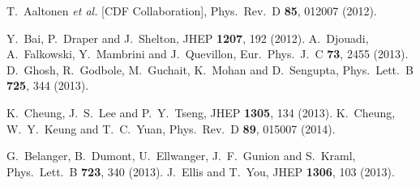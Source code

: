 \documentclass[aps,prl,twocolumn,preprintnumbers,groupedaddress,nofootinbib]{revtex4}
\begin{document}
\begin{thebibliography}{99}
  T.~Aaltonen {\it et al.}  [CDF Collaboration],
  Phys.\ Rev.\ D {\bf 85}, 012007 (2012).

  Y.~Bai, P.~Draper and J.~Shelton,
  JHEP {\bf 1207}, 192 (2012).
  A.~Djouadi, A.~Falkowski, Y.~Mambrini and J.~Quevillon,
  Eur.\ Phys.\ J.\ C {\bf 73}, 2455 (2013).
  D.~Ghosh, R.~Godbole, M.~Guchait, K.~Mohan and D.~Sengupta,
  Phys.\  Lett.\ B {\bf 725}, 344 (2013).
  
  K.~Cheung, J.~S.~Lee and P.~Y.~Tseng,
  JHEP {\bf 1305}, 134 (2013).
  K.~Cheung, W.~Y.~Keung and T.~C.~Yuan,
  Phys.\ Rev.\ D {\bf 89}, 015007 (2014).

  G.~Belanger, B.~Dumont, U.~Ellwanger, J.~F.~Gunion and S.~Kraml,
  Phys.\ Lett.\ B {\bf 723}, 340 (2013).
  J.~Ellis and T.~You,
  JHEP {\bf 1306}, 103 (2013).
    

\end{thebibliography}
\end{document}

